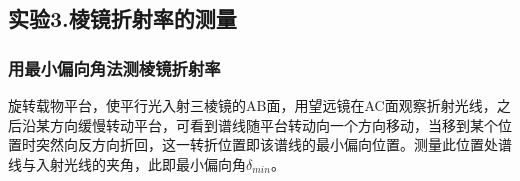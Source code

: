 \subsection*{实验3.棱镜折射率的测量}
\subsubsection*{用最小偏向角法测棱镜折射率}
旋转载物平台，使平行光入射三棱镜的AB面，用望远镜在AC面观察折射光线，之后沿某方向缓慢转动平台，可看到谱线随平台转动向一个方向移动，当移到某个位置时突然向反方向折回，这一转折位置即该谱线的最小偏向位置。测量此位置处谱线与入射光线的夹角，此即最小偏向角${\delta}_{min}$。